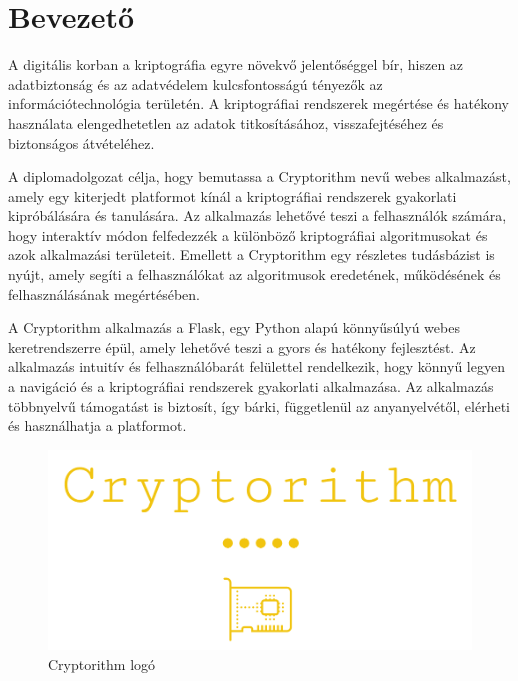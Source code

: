\chapter{Bevezető}%

A digitális korban a kriptográfia egyre növekvő jelentőséggel bír, hiszen az adatbiztonság és az adatvédelem kulcsfontosságú tényezők az információtechnológia területén. A kriptográfiai rendszerek megértése és hatékony használata elengedhetetlen az adatok titkosításához, visszafejtéséhez és biztonságos átvételéhez.

A diplomadolgozat célja, hogy bemutassa a Cryptorithm nevű webes alkalmazást, amely egy kiterjedt platformot kínál a kriptográfiai rendszerek gyakorlati kipróbálására és tanulására. Az alkalmazás lehetővé teszi a felhasználók számára, hogy interaktív módon felfedezzék a különböző kriptográfiai algoritmusokat és azok alkalmazási területeit. Emellett a Cryptorithm egy részletes tudásbázist is nyújt, amely segíti a felhasználókat az algoritmusok eredetének, működésének és felhasználásának megértésében.

A Cryptorithm alkalmazás a Flask, egy Python alapú könnyűsúlyú webes keretrendszerre épül, amely lehetővé teszi a gyors és hatékony fejlesztést. Az alkalmazás intuitív és felhasználóbarát felülettel rendelkezik, hogy könnyű legyen a navigáció és a kriptográfiai rendszerek gyakorlati alkalmazása. Az alkalmazás többnyelvű támogatást is biztosít, így bárki, függetlenül az anyanyelvétől, elérheti és használhatja a platformot.

\begin{figure}[!h]
	\centering
	\includegraphics[scale=0.25]{images/logoCryptorithm}
	\caption{Cryptorithm logó}
\end{figure}
\pagebreak


